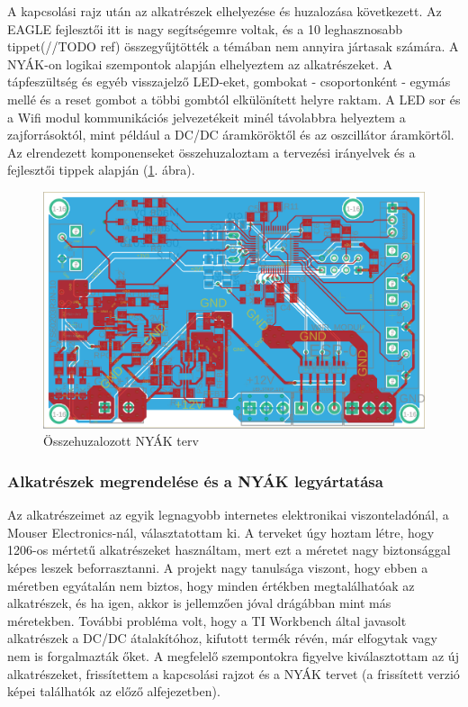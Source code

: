 \documentclass[../main.tex]{subfiles}
\begin{document}
            
            A kapcsolási rajz után az alkatrészek elhelyezése és huzalozása következett. Az EAGLE fejlesztői itt is nagy segítségemre voltak, és a 10 leghasznosabb tippet(//TODO ref) 
            összegyűjtötték a témában nem annyira jártasak számára.
            A NYÁK-on logikai szempontok alapján elhelyeztem az alkatrészeket. A tápfeszültség és egyéb visszajelző LED-eket, gombokat - csoportonként - egymás mellé és a reset gombot a többi gombtól elkülönített helyre raktam. A LED sor és a Wifi modul kommunikációs jelvezetékeit minél távolabbra helyeztem a zajforrásoktól, mint például a DC/DC áramköröktől és az oszcillátor áramkörtől. Az elrendezett komponenseket összehuzaloztam a tervezési irányelvek és a fejlesztői tippek alapján (\ref{fig:board_v02}. ábra). 
            
            \begin{figure}[h!]
                \centering
                    \includegraphics[width=12cm]{resources/pcb_res/board_v02.png}
                \caption{Összehuzalozott NYÁK terv}
                \label{fig:board_v02}
            \end{figure}
            
        \subsubsection{Alkatrészek megrendelése és a NYÁK legyártatása}
            
            Az alkatrészeimet az egyik legnagyobb internetes elektronikai viszonteladónál, a Mouser Electronics-nál, választatottam ki. A terveket úgy hoztam létre, hogy 1206-os mértetű alkatrészeket használtam, mert ezt a méretet nagy biztonsággal képes leszek beforrasztanni. A projekt nagy tanulsága viszont, hogy ebben a méretben egyátalán nem biztos, hogy minden értékben megtalálhatóak az alkatrészek, és ha igen, akkor is jellemzően jóval drágábban mint más méretekben. További probléma volt, hogy a TI Workbench által javasolt alkatrészek a DC/DC átalakítóhoz, kifutott termék révén, már elfogytak vagy nem is forgalmazták őket. A megfelelő szempontokra figyelve kiválasztottam az új alkatrészeket, frissítettem a kapcsolási rajzot és a NYÁK tervet (a frissített verzió képei találhatók az előző alfejezetben). 
            
\end{document}
